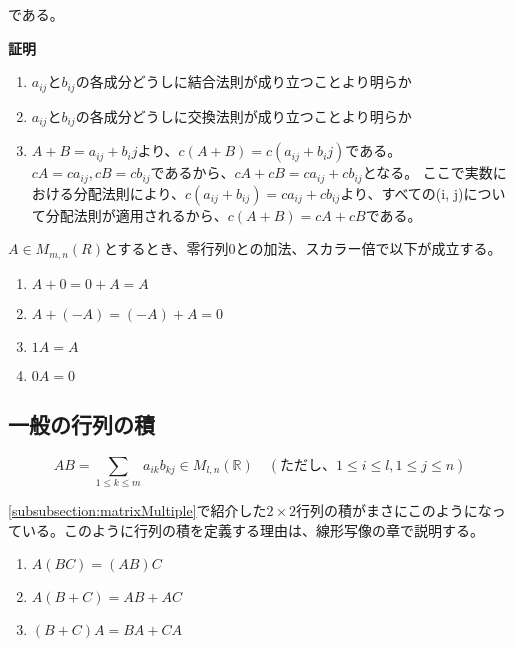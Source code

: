 \documentclass[dvipdfmx,autodetect-engine]{jsarticle}
\begin{document}
である。

{\bf 証明}

\begin{enumerate}
\renewcommand{\labelenumi}{(\arabic{enumi})}
\item $a_{ij}とb_{ij}の各成分どうしに結合法則が成り立つことより明らか$
\item $a_{ij}とb_{ij}の各成分どうしに交換法則が成り立つことより明らか$
\item $A + B = a_{ij} + b_ij$より、$c(A + B) = c(a_{ij} + b_ij)$である。
$cA = ca_{ij}, cB = cb_{ij}$であるから、$cA + cB = ca_{ij} + cb_{ij}$となる。
ここで実数における分配法則により、$c(a_{ij} + b_{ij}) = ca_{ij} + cb_{ij}$より、すべての(i, j)について分配法則が適用されるから、$c(A+B) = cA + cB$である。
\end{enumerate}


$A \in M_{m,n}(R)$とするとき、零行列$0$との加法、スカラー倍で以下が成立する。

\begin{enumerate}
\renewcommand{\labelenumi}{(\arabic{enumi})}
\item $A + 0 = 0 + A = A$
\item $A + (-A) = (-A) + A = 0$
\item $1A = A$
\item $0A = 0$
\end{enumerate}


\subsection{一般の行列の積}

\label{defi:matrixMultiple}

$$
AB = \sum_{1 \leq k \leq m} a_{ik}b_{kj} \in M_{l, n}(\mathbb{R})
\quad (ただし、1 \leq i \leq l, 1 \leq j \leq n)
$$

\ref{subsubsection:matrixMultiple}で紹介した$2 \times 2$行列の積がまさにこのようになっている。このように行列の積を定義する理由は、線形写像の章で説明する。


\begin{enumerate}
\renewcommand{\labelenumi}{(\arabic{enumi})}
\item $A(BC) = (AB)C$
\item $A(B+C) = AB + AC$
\item $(B+C)A = BA + CA$
\end{enumerate}
\end{document}
